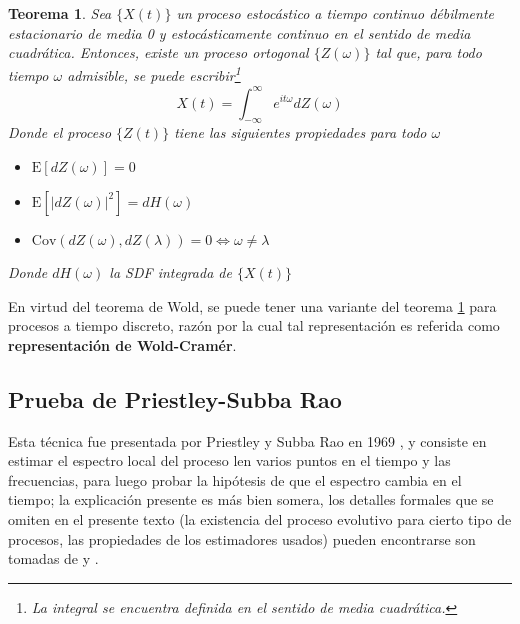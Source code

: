 \documentclass[12pt,a4paper]{mitthesis}
\newtheorem{thrm}{Teorema}
\newcommand{\intR}{\int_{-\infty}^{\infty}}
\newcommand{\E}[1]{\mathrm{E}\left[ #1 \right]}
\newcommand{\Cov}[1]{\mathrm{Cov}\left( #1 \right)}
\newcommand{\abso}[1]{\left| #1 \right|}
\begin{document}
\newpage

\begin{thrm}
Sea $\{X(t)\}$ un proceso estoc\'astico a tiempo continuo d\'ebilmente estacionario de media 0 y 
estoc\'asticamente continuo en el sentido de media cuadr\'atica. Entonces, existe un proceso 
ortogonal $\{Z(\omega)\}$ tal que, para todo tiempo $\omega$ admisible, se puede 
escribir\footnote{La integral se encuentra definida en el sentido de media cuadr\'atica.}
\begin{equation*}
X(t) = \intR e^{i t \omega} dZ(\omega)
\end{equation*}
Donde el proceso $\{Z(t)\}$ tiene las siguientes propiedades para todo $\omega$
\begin{itemize}
\item $\E{dZ(\omega)} = 0$
\item $\E{\abso{dZ(\omega)}^{2}} = dH(\omega)$
\item $\Cov{dZ(\omega),dZ(\lambda)} = 0 \Leftrightarrow \omega \neq \lambda$
\end{itemize}
Donde $dH(\omega)$ la SDF integrada de $\{X(t)\}$
\label{rep_espectral}
\end{thrm}

En virtud del teorema de Wold, se puede tener una variante del teorema \ref{rep_espectral}
para procesos a tiempo discreto, raz\'on por la cual  
tal representaci\'on es referida como \textbf{representaci\'on de Wold-Cram\'er}.


\subsection{Prueba de Priestley-Subba Rao}

Esta t\'ecnica fue presentada por Priestley y Subba Rao en 1969 \cite{Priestley69}, y consiste en 
estimar el espectro local del proceso len varios puntos en el tiempo y las frecuencias, para luego 
probar la hip\'otesis de que el espectro cambia en el tiempo; la explicaci\'on presente es m\'as 
bien somera, los detalles formales que se omiten en el presente texto (la existencia del proceso 
evolutivo para cierto tipo de procesos, las propiedades de los estimadores usados) pueden 
encontrarse son tomadas de \cite{Priestley65} y \cite{Priestley66}.
\end{document}
